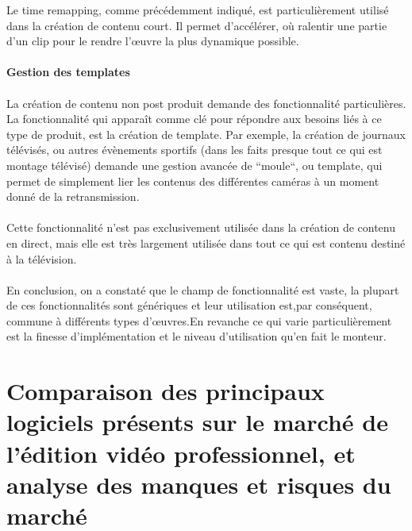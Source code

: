 Le time remapping, comme précédemment indiqué, est particulièrement utilisé dans
la création de contenu court. Il permet d'accélérer, où ralentir une partie d'un
clip pour le rendre l'œuvre la plus dynamique possible.

\paragraph{Gestion des templates}

\paragraph{ }

La création de contenu non post produit demande des fonctionnalité particulières. La fonctionnalité
qui apparaît comme clé pour répondre aux besoins liés à ce type de produit, est la
création de template. Par exemple, la création de journaux télévisés, ou autres évènements
sportifs (dans les faits presque tout ce qui est montage télévisé) demande une gestion avancée de ``moule``,
ou template, qui permet de simplement lier les contenus des différentes caméras
à un moment donné de la retransmission.

\paragraph{ }

Cette fonctionnalité n'est pas exclusivement utilisée dans la création de contenu en direct, mais
elle est très largement utilisée dans tout ce qui est contenu destiné à la télévision.

\paragraph{}
\paragraph{}

En conclusion, on a constaté que le champ de fonctionnalité est vaste, la plupart de ces
fonctionnalités sont génériques et leur
utilisation est,par conséquent, commune à différents types d'œuvres.En revanche ce qui varie particulièrement  est
la finesse d'implémentation et le niveau d'utilisation qu'en fait le monteur.

\newpage
\section{Comparaison des principaux logiciels présents sur le marché de
  l'édition vidéo professionnel, et analyse des manques et risques du marché}

